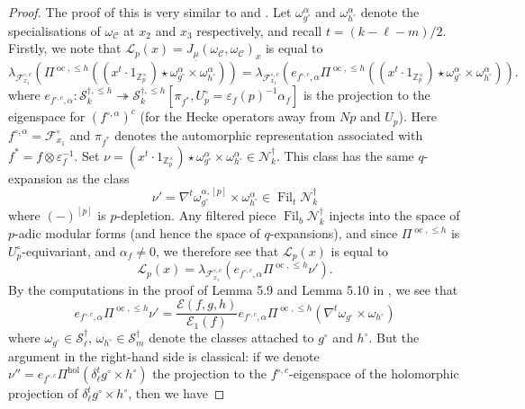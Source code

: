 \documentclass[10pt, oneside]{amsart}
\numberwithin{equation}{subsection}
\theoremstyle{definition}
\theoremstyle{remark}
\newcommand{\mbb}[1]{\mathbb{#1}}
\newcommand{\opn}[1]{\operatorname{#1}}
\begin{document}
\begin{proof}
The proof of this is very similar to \cite{DarmonRotgerGrossZagier1} and \cite{AI_LLL}. Let $\omega_{g^{\circ}}^{\alpha}$ and $\omega_{h^{\circ}}^{\alpha}$ denote the specialisations of $\omega_{\mathcal{C}}$ at $x_2$ and $x_3$ respectively, and recall $t = (k-\ell-m)/2$. Firstly, we note that $\mathscr{L}_p(x) = J_{\underline{\mu}}( \omega_{\mathcal{C}}, \omega_{\mathcal{C}})_x$ is equal to 
\[
\lambda_{\mathcal{F}^{\circ, c}_{x_1}} ( \Pi^{\opn{oc}, \leq h} \left( (x^t\cdot 1_{\mbb{Z}_p^{\times}} ) \star \omega_{g^{\circ}}^{\alpha} \times \omega_{h^{\circ}}^{\alpha} \right) ) = \lambda_{\mathcal{F}^{\circ, c}_{x_1}} ( e_{f^{\circ, c}, \alpha} \Pi^{\opn{oc}, \leq h} \left( (x^t \cdot 1_{\mbb{Z}_p^{\times}} ) \star \omega_{g^{\circ}}^{\alpha} \times \omega_{h^{\circ}}^{\alpha} \right) ) .
\]
where $e_{f^{\circ, c}, \alpha} \colon \mathscr{S}^{\dagger, \leq h}_{k} \twoheadrightarrow \mathscr{S}^{\dagger, \leq h}_{k}[\pi_{f^*}, U_p^{\circ} = \varepsilon_f(p)^{-1}\alpha_f]$ is the projection to the eigenspace for $(f^{\circ, \alpha})^{c}$ (for the Hecke operators away from $Np$ and $U_p$). Here $f^{\circ, \alpha} = \mathcal{F}^{\circ}_{x_1}$ and $\pi_{f^*}$ denotes the automorphic representation associated with $f^* = f \otimes \varepsilon_f^{-1}$. Set $\nu = (x^t\cdot 1_{\mbb{Z}_p^{\times}} ) \star \omega_{g^{\circ}}^{\alpha} \times \omega_{h^{\circ}}^{\alpha} \in \mathscr{N}^{\dagger}_k$. This class has the same $q$-expansion as the class
\[
\nu' = \nabla^t \omega^{\alpha, [p]}_{g^{\circ}} \times \omega_{h^{\circ}}^{\alpha} \in \opn{Fil}_t \mathscr{N}^{\dagger}_k
\]
where $(-)^{[p]}$ is $p$-depletion. Any filtered piece $\opn{Fil}_{b}\mathscr{N}^{\dagger}_k$ injects into the space of $p$-adic modular forms (and hence the space of $q$-expansions), and since $\Pi^{\opn{oc}, \leq h}$ is $U_p^{\circ}$-equivariant, and $\alpha_f \neq 0$, we therefore see that $\mathscr{L}_p(x)$ is equal to
\[
\mathscr{L}_p(x) = \lambda_{\mathcal{F}_{x_1}^{\circ, c}}(e_{f^{\circ, c}, \alpha} \Pi^{\opn{oc}, \leq h} \nu').
\]
By the computations in the proof of Lemma 5.9 and Lemma 5.10 in \cite{AI_LLL}, we see that
\[
e_{f^{\circ, c}, \alpha} \Pi^{\opn{oc}, \leq h} \nu' = \frac{\mathcal{E}(f, g, h)}{\mathcal{E}_1(f)} e_{f^{\circ, c}, \alpha} \Pi^{\opn{oc}, \leq h} (\nabla^t \omega_{g^{\circ}} \times \omega_{h^{\circ}} )
\]
where $\omega_{g^{\circ}} \in \mathscr{S}^{\dagger}_{\ell}$, $\omega_{h^{\circ}} \in \mathscr{S}^{\dagger}_m$ denote the classes attached to $g^{\circ}$ and $h^{\circ}$. But the argument in the right-hand side is classical: if we denote $\nu'' = e_{f^{\circ, c}} \Pi^{\opn{hol}}(\delta_{\ell}^t g^{\circ} \times h^{\circ})$ the projection to the $f^{\circ, c}$-eigenspace of the holomorphic projection of $\delta_{\ell}^t g^{\circ} \times h^{\circ}$, then we have

\end{proof}
\end{document}
